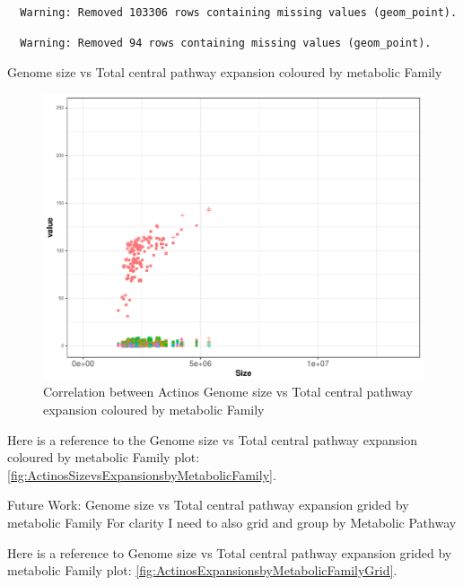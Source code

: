 \documentclass[12pt,twoside]{reedthesis}
\begin{document}
  \begin{verbatim}
  Warning: Removed 103306 rows containing missing values (geom_point).
  \end{verbatim}
  
  \begin{verbatim}
  Warning: Removed 94 rows containing missing values (geom_point).
  \end{verbatim}
  
  Genome size vs Total central pathway expansion coloured by metabolic
  Family
  
  \begin{figure}[h!tbp]
  \centering
  \includegraphics[angle = 0,scale = 0.6]{chapter4/ActinosSizevsExpansionsbyMetabolicFamily.pdf}
  \caption[Correlation between Actinos Genome size vs Total central pathway expansion coloured by metabolic Family]{\normalsize{Correlation between Actinos Genome size vs Total central pathway expansion coloured by metabolic Family}}
  \label{fig:ActinosSizevsExpansionsbyMetabolicFamily}
  \end{figure}
  
  Here is a reference to the Genome size vs Total central pathway
  expansion coloured by metabolic Family plot:
  \autoref{fig:ActinosSizevsExpansionsbyMetabolicFamily}. \clearpage 
  
  Future Work: Genome size vs Total central pathway expansion grided by
  metabolic Family For clarity I need to also grid and group by Metabolic
  Pathway
  
  Here is a reference to Genome size vs Total central pathway expansion
  grided by metabolic Family plot:
  \autoref{fig:ActinosExpansionsbyMetabolicFamilyGrid}. \clearpage 
  
\end{document}

